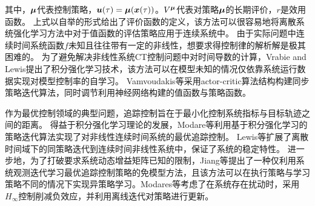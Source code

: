 其中，$\boldsymbol \mu$代表控制策略，$\boldsymbol u(\tau)=\boldsymbol \mu(\boldsymbol x(\tau))$。$V^{\boldsymbol \mu}$代表对策略$\boldsymbol \mu$的长期评价，$r$是效用函数。
上式以自举的形式给出了评价函数的定义，该方法可以很容易地将离散系统强化学习方法中对于值函数的评估策略应用于连续系统中。
由于实际问题中连续时间系统函数$f$未知且往往带有一定的非线性，想要求得控制律的解析解是极其困难的。
为了避免解决非线性系统CT控制问题中对时间导数的计算，Vrabie and Lewis\cite{vrabie2009neural}提出了积分强化学习技术，该方法可以在模型未知的情况仅依靠系统运行数据实现对模型控制率的自学习。
Vamvoudakis等\cite{vamvoudakis2014online}采用actor-critic算法结构构建同步策略迭代算法，同时调节利用神经网络构建的值函数与策略函数。

作为最优控制领域的典型问题，追踪控制旨在于最小化控制系统指标与目标轨迹之间的距离。
得益于积分强化学习理论的发展，Modare等\cite{modares2014linear}利用基于积分强化学习的策略迭代算法实现了对非线性连续时间系统的最优追踪控制。
Lewis等\cite{modares2014optimal}扩展了离散时间域下的同策略迭代到连续时间非线性系统中，保证了系统的稳定特性。
进一步地，为了打破要求系统动态增益矩阵已知的限制，Jiang等\cite{jiang2012computational}提出了一种仅利用系统观测迭代学习最优追踪控制策略的免模型方法，且该方法可以在执行策略与学习策略不同的情况下实现异策略学习。Modares等\cite{modares2015h}考虑了在系统存在扰动时，采用$H_{\infty}$控制削减负效应，并利用离线迭代对策略进行更新。

